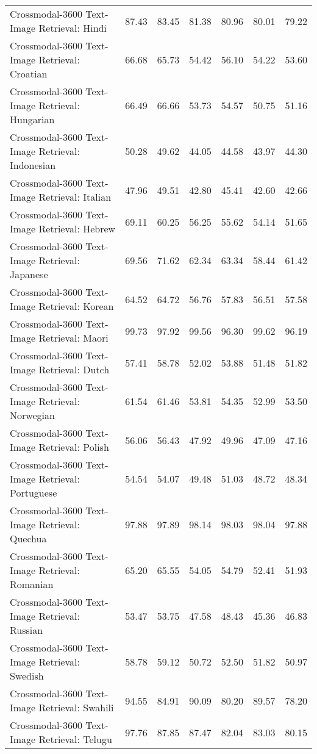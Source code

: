 {\begin{longtable}{l|rr|rr|rr}
Crossmodal-3600 Text-Image Retrieval: Hindi & 87.43 & 83.45 & 81.38 & 80.96 & 80.01 & 79.22 \\
Crossmodal-3600 Text-Image Retrieval: Croatian & 66.68 & 65.73 & 54.42 & 56.10 & 54.22 & 53.60 \\
Crossmodal-3600 Text-Image Retrieval: Hungarian & 66.49 & 66.66 & 53.73 & 54.57 & 50.75 & 51.16 \\
Crossmodal-3600 Text-Image Retrieval: Indonesian & 50.28 & 49.62 & 44.05 & 44.58 & 43.97 & 44.30 \\
Crossmodal-3600 Text-Image Retrieval: Italian & 47.96 & 49.51 & 42.80 & 45.41 & 42.60 & 42.66 \\
Crossmodal-3600 Text-Image Retrieval: Hebrew & 69.11 & 60.25 & 56.25 & 55.62 & 54.14 & 51.65 \\
Crossmodal-3600 Text-Image Retrieval: Japanese & 69.56 & 71.62 & 62.34 & 63.34 & 58.44 & 61.42 \\
Crossmodal-3600 Text-Image Retrieval: Korean & 64.52 & 64.72 & 56.76 & 57.83 & 56.51 & 57.58 \\
Crossmodal-3600 Text-Image Retrieval: Maori & 99.73 & 97.92 & 99.56 & 96.30 & 99.62 & 96.19 \\
Crossmodal-3600 Text-Image Retrieval: Dutch & 57.41 & 58.78 & 52.02 & 53.88 & 51.48 & 51.82 \\
Crossmodal-3600 Text-Image Retrieval: Norwegian & 61.54 & 61.46 & 53.81 & 54.35 & 52.99 & 53.50 \\
Crossmodal-3600 Text-Image Retrieval: Polish & 56.06 & 56.43 & 47.92 & 49.96 & 47.09 & 47.16 \\
Crossmodal-3600 Text-Image Retrieval: Portuguese & 54.54 & 54.07 & 49.48 & 51.03 & 48.72 & 48.34 \\
Crossmodal-3600 Text-Image Retrieval: Quechua & 97.88 & 97.89 & 98.14 & 98.03 & 98.04 & 97.88 \\
Crossmodal-3600 Text-Image Retrieval: Romanian & 65.20 & 65.55 & 54.05 & 54.79 & 52.41 & 51.93 \\
Crossmodal-3600 Text-Image Retrieval: Russian & 53.47 & 53.75 & 47.58 & 48.43 & 45.36 & 46.83 \\
Crossmodal-3600 Text-Image Retrieval: Swedish & 58.78 & 59.12 & 50.72 & 52.50 & 51.82 & 50.97 \\
Crossmodal-3600 Text-Image Retrieval: Swahili & 94.55 & 84.91 & 90.09 & 80.20 & 89.57 & 78.20 \\
Crossmodal-3600 Text-Image Retrieval: Telugu & 97.76 & 87.85 & 87.47 & 82.04 & 83.03 & 80.15 \\

\end{longtable}}
